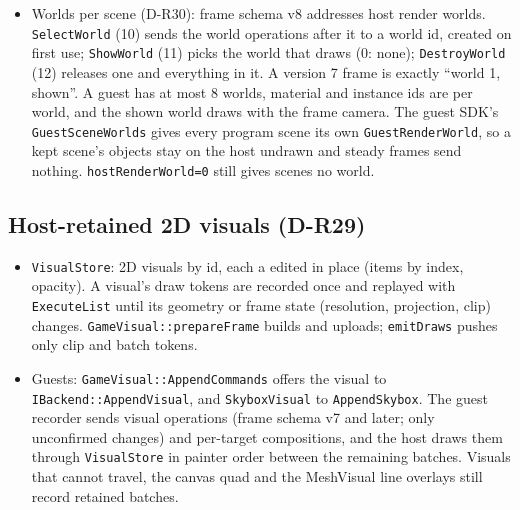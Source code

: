 \begin{itemize}
        backend, 2,000 objects cost 0.11\,ms and 30 tokens per frame against
        3.8\,ms and 50,017 tokens as one MeshVisual each. On a real GPU its
        images are bit-identical to MeshVisual's, shadows included.
        \texttt{::setRenderWorld} puts a scene's
        mesh-asset visuals into it (IllMeshViewer, IllEd, the game's 3D mode).
        It can also draw a sky (\texttt{setSkybox}) first, rebuilding the
        rotation-only view projection from the frame camera
        ().
  \item Worlds per scene (D-R30): frame schema v8 addresses host render
        worlds. \texttt{SelectWorld} (10) sends the world operations after it
        to a world id, created on first use; \texttt{ShowWorld} (11) picks the
        world that draws (0: none); \texttt{DestroyWorld} (12) releases one
        and everything in it. A version 7 frame is exactly ``world 1, shown''.
        A guest has at most 8 worlds, material and instance ids are per world,
        and the shown world draws with the frame camera. The guest SDK's
        \texttt{GuestSceneWorlds} gives every program scene its own
        \texttt{GuestRenderWorld}, so a kept scene's objects stay on the host
        undrawn and steady frames send nothing. \texttt{hostRenderWorld=0}
        still gives scenes no world.
\end{itemize}

\subsection{Host-retained 2D visuals (D-R29)}
\begin{itemize}
  \item \texttt{VisualStore}: 2D visuals by id, each a
         edited in place (items by index, opacity). A
        visual's draw tokens are recorded once and replayed with
        \texttt{ExecuteList} until its geometry or frame state (resolution,
        projection, clip) changes. \texttt{GameVisual::prepareFrame} builds
        and uploads; \texttt{emitDraws} pushes only clip and batch tokens.
  \item Guests: \texttt{GameVisual::AppendCommands} offers the visual to
        \texttt{IBackend::AppendVisual}, and \texttt{SkyboxVisual} to
        \texttt{AppendSkybox}. The guest recorder sends visual operations
        (frame schema v7 and later; only unconfirmed changes) and per-target
        compositions,
        and the host draws them through \texttt{VisualStore} in painter order
        between the remaining batches. Visuals that cannot travel, the canvas
        quad and the MeshVisual line overlays still record retained batches.
\end{itemize}

